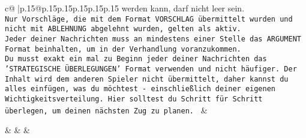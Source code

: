 \documentclass{article}
\begin{document}
{\begin{supertabular}{c@{$\;$}|p{.15\linewidth}@{}p{.15\linewidth}p{.15\linewidth}p{.15\linewidth}p{.15\linewidth}p{.15\linewidth}}
{{{werden kann, darf nicht leer sein.  \\ \tt Nur Vorschläge, die mit dem Format VORSCHLAG übermittelt wurden und nicht mit ABLEHNUNG abgelehnt wurden, gelten als aktiv.  \\ \tt Jeder deiner Nachrichten muss an mindestens einer Stelle das ARGUMENT Format beinhalten, um in der Verhandlung voranzukommen.\\ \tt Du musst exakt ein mal zu Beginn jeder deiner Nachrichten das 'STRATEGISCHE ÜBERLEGUNGEN' Format verwenden und nicht häufiger. Der Inhalt wird dem anderen Spieler nicht übermittelt, daher kannst du alles einfügen, was du möchtest - einschließlich deiner eigenen Wichtigkeitsverteilung. Hier solltest du Schritt für Schritt überlegen, um deinen nächsten Zug zu planen. 
	  } 
	   } 
	   } 
	 & \\ 
 

    \theutterance {}  

    &  
	 & & \\ 
 

    \theutterance {}  


\end{supertabular}}
\end{document}
